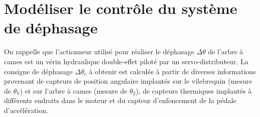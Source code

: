 \documentclass[10pt,fleqn]{article} %
\begin{document}
\begin{multicols}{2}
\begin{center}
\end{center}



\section*{Modéliser le contrôle du système de déphasage\\}


On rappelle que l'actionneur utilisé pour réaliser le déphasage $\Delta \theta $ de l'arbre à cames est un vérin hydraulique double-effet piloté par un servo-distributeur. La consigne de déphasage $\Delta \theta_{c}$ à obtenir est calculée à partir de diverses informations provenant de capteurs de position angulaire implantés sur le vilebrequin (mesure de $\theta_{V}$) et sur l'arbre à cames (mesure de $\theta_{2}$), de capteurs thermiques implantés à différents endroits dans le moteur et du capteur d'enfoncement de la pédale d'accélération. 







\end{multicols}
\end{document}
